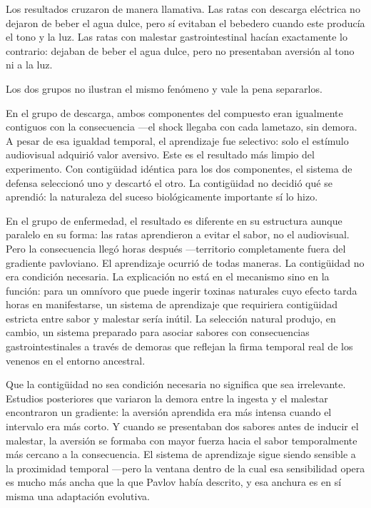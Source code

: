 \documentclass[
  letterpaper,
  DIV=11,
  numbers=noendperiod]{scrreprt}
\begin{document}
\begin{tcolorbox}[enhanced jigsaw, toprule=.15mm, arc=.35mm, colback=white, opacityback=0, colframe=quarto-callout-note-color-frame, breakable, rightrule=.15mm, left=2mm, leftrule=.75mm, bottomrule=.15mm]
Los resultados cruzaron de manera llamativa. Las ratas con descarga
eléctrica no dejaron de beber el agua dulce, pero sí evitaban el
bebedero cuando este producía el tono y la luz. Las ratas con malestar
gastrointestinal hacían exactamente lo contrario: dejaban de beber el
agua dulce, pero no presentaban aversión al tono ni a la luz.

Los dos grupos no ilustran el mismo fenómeno y vale la pena separarlos.

En el grupo de descarga, ambos componentes del compuesto eran igualmente
contiguos con la consecuencia ---el shock llegaba con cada lametazo, sin
demora. A pesar de esa igualdad temporal, el aprendizaje fue selectivo:
solo el estímulo audiovisual adquirió valor aversivo. Este es el
resultado más limpio del experimento. Con contigüidad idéntica para los
dos componentes, el sistema de defensa seleccionó uno y descartó el
otro. La contigüidad no decidió qué se aprendió: la naturaleza del
suceso biológicamente importante sí lo hizo.

En el grupo de enfermedad, el resultado es diferente en su estructura
aunque paralelo en su forma: las ratas aprendieron a evitar el sabor, no
el audiovisual. Pero la consecuencia llegó horas después ---territorio
completamente fuera del gradiente pavloviano. El aprendizaje ocurrió de
todas maneras. La contigüidad no era condición necesaria. La explicación
no está en el mecanismo sino en la función: para un omnívoro que puede
ingerir toxinas naturales cuyo efecto tarda horas en manifestarse, un
sistema de aprendizaje que requiriera contigüidad estricta entre sabor y
malestar sería inútil. La selección natural produjo, en cambio, un
sistema preparado para asociar sabores con consecuencias
gastrointestinales a través de demoras que reflejan la firma temporal
real de los venenos en el entorno ancestral.

Que la contigüidad no sea condición necesaria no significa que sea
irrelevante. Estudios posteriores que variaron la demora entre la
ingesta y el malestar encontraron un gradiente: la aversión aprendida
era más intensa cuando el intervalo era más corto. Y cuando se
presentaban dos sabores antes de inducir el malestar, la aversión se
formaba con mayor fuerza hacia el sabor temporalmente más cercano a la
consecuencia. El sistema de aprendizaje sigue siendo sensible a la
proximidad temporal ---pero la ventana dentro de la cual esa
sensibilidad opera es mucho más ancha que la que Pavlov había descrito,
y esa anchura es en sí misma una adaptación evolutiva.


\end{tcolorbox}
\end{document}
